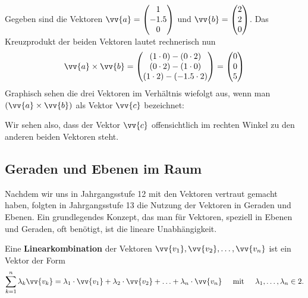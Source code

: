 \documentclass[ngerman, 12pt]{nssheetxea}
\begin{document}
\begin{example}
Gegeben sind die Vektoren $\vv{a}=\colvec[1]{-\num{1,5}}{0}$ und $\vv{b}=\colvec[2]{2}{0}$. Das Kreuzprodukt der beiden Vektoren lautet rechnerisch nun
\[ \vv{a} \times \vv{b} = \colvec[(1\cdot 0) - (0 \cdot 2)]{(0\cdot 2) - (1 \cdot 0)}{(1\cdot 2) - (-\num{1,5} \cdot 2)} = \colvec[0]{0}{5}\]
Graphisch sehen die drei Vektoren im Verhältnis wiefolgt aus, wenn man $(\vv{a}\times \vv{b})$ als Vektor $\vv{c}$ bezeichnet:
\begin{center}
\end{center}
Wir sehen also, dass der Vektor $\vv{c}$ offensichtlich im rechten Winkel zu den anderen beiden Vektoren steht. 
\end{example}

\newpage 

\subsection{Geraden und Ebenen im Raum}

Nachdem wir uns in Jahrgangsstufe 12 mit den Vektoren vertraut gemacht haben, folgten in Jahrgangsstufe 13 die Nutzung der Vektoren in Geraden und Ebenen. Ein grundlegendes Konzept, das man für Vektoren, speziell in Ebenen und Geraden, oft benötigt, ist die lineare Unabhängigkeit.

\begin{definition}
Eine \textbf{Linearkombination} der Vektoren $\vv{v_1}, \vv{v_2}, \ldots, \vv{v_n}$ ist ein Vektor der Form
\[ \sum_{k=1}^n \lambda_k \vv{v_k} = \lambda_1 \cdot \vv{v_1} + \lambda_2 \cdot \vv{v_2} + \ldots + \lambda_n \cdot \vv{v_n} \hspace{0.5cm} \text{mit} \hspace{0.5cm} \lambda_1,\ldots ,\lambda_n \in \R . \]
\end{definition}
\end{document}
